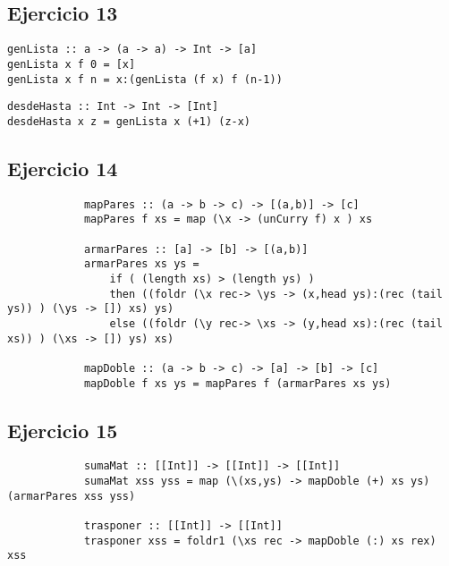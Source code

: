 \subsection{Ejercicio 13}
\begin{centrado}
	\begin{verbatim}
genLista :: a -> (a -> a) -> Int -> [a]
genLista x f 0 = [x]
genLista x f n = x:(genLista (f x) f (n-1))
	\end{verbatim}
\end{centrado}

\begin{centrado}
	\begin{verbatim}
desdeHasta :: Int -> Int -> [Int]
desdeHasta x z = genLista x (+1) (z-x)
	\end{verbatim}
\end{centrado}

\subsection{Ejercicio 14}
	\begin{centrado}
		\begin{verbatim}
			mapPares :: (a -> b -> c) -> [(a,b)] -> [c]
			mapPares f xs = map (\x -> (unCurry f) x ) xs
			
			armarPares :: [a] -> [b] -> [(a,b)]
			armarPares xs ys = 
				if ( (length xs) > (length ys) )
				then ((foldr (\x rec-> \ys -> (x,head ys):(rec (tail ys)) ) (\ys -> []) xs) ys)
				else ((foldr (\y rec-> \xs -> (y,head xs):(rec (tail xs)) ) (\xs -> []) ys) xs)
			
			mapDoble :: (a -> b -> c) -> [a] -> [b] -> [c]
			mapDoble f xs ys = mapPares f (armarPares xs ys)
		\end{verbatim}
	\end{centrado}
	
\subsection{Ejercicio 15}
	\begin{centrado}
		\begin{verbatim}
			sumaMat :: [[Int]] -> [[Int]] -> [[Int]]
			sumaMat xss yss = map (\(xs,ys) -> mapDoble (+) xs ys) (armarPares xss yss)
			
			trasponer :: [[Int]] -> [[Int]]
			trasponer xss = foldr1 (\xs rec -> mapDoble (:) xs rex) xss
		\end{verbatim}
	\end{centrado}

